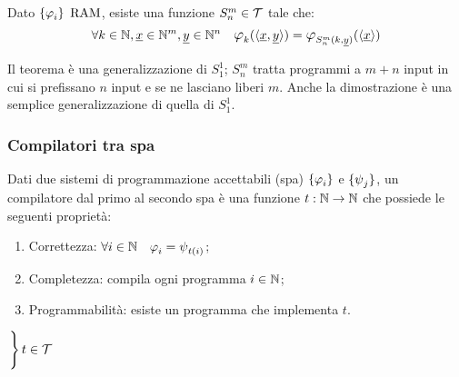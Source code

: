 \begin{theorem}[$S_n^m$]
    Dato $\sistProg$ $\text{RAM}$, esiste una funzione $S_n^m\in\mathcal{T}$ tale che:
    $$ \forall k\in\N,\sottolinea{x}\in\N^m,\sottolinea{y}\in\N^n 
    \quad \semRAM_k(\cantor{\sottolinea{x},\sottolinea{y}})
    = \semRAM_{S_n^m(k,\sottolinea{y})}(\cantor{\sottolinea{x}}) $$
\end{theorem}
Il teorema è una generalizzazione di $S_1^1$; $S_n^m$ tratta programmi a $m+n$
input in cui si prefissano $n$ input e se ne lasciano liberi $m$. Anche la
dimostrazione è una semplice generalizzazione di quella di $S_1^1$.

\subsubsection{Compilatori tra spa}
Dati due sistemi di programmazione accettabili (spa) $\sistProg$ e $\sistProgW$, un
compilatore dal primo al secondo spa è una funzione $t:\mathbb{N}\to\mathbb{N}$ che possiede le
seguenti proprietà:

\begin{minipage}{.66\textwidth}
\begin{enumerate}
    \setlength\itemsep{.4em}
    \item Correttezza: $\forall i\in\N \quad \semRAM_i=\semWHILE_{t(i)}$;
    \item Completezza: compila ogni programma $i\in\mathbb{N}$;
    \item Programmabilità: esiste un programma che implementa $t$.
\end{enumerate}    
\end{minipage}
\begin{minipage}{.25\textwidth}
    \vspace{1.1em}
    $\begin{rcases}
        \phantom{}\\\phantom{}\\
    \end{rcases} t\in\mathcal{T}$
\end{minipage}\vspace{1em}

